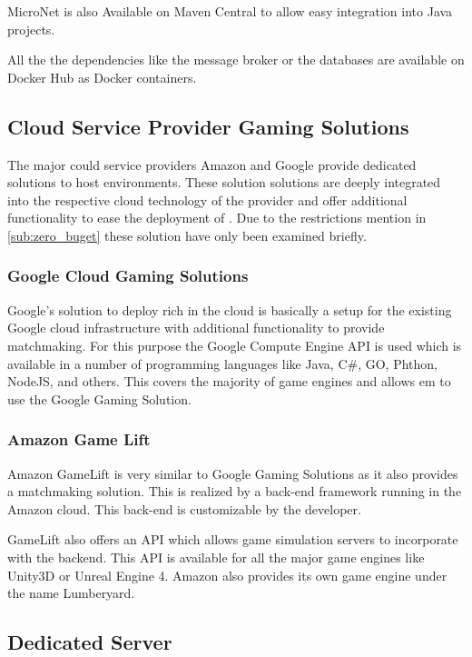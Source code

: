 MicroNet is also Available on Maven Central to allow easy integration into Java
projects.

All the the dependencies like the message broker or the databases are available
on Docker Hub as Docker containers.

\subsection{Cloud Service Provider Gaming Solutions}

The major could service providers Amazon and Google provide dedicated solutions
to host \og{} environments. These solution solutions are deeply integrated
into the respective cloud technology of the provider and offer additional
functionality to ease the deployment of \ogs{}. Due to the restrictions mention
in \autoref{sub:zero_buget} these solution have only been examined briefly.

\subsubsection{Google Cloud Gaming Solutions}

Google's solution to deploy rich \ogs{} in the cloud is basically a setup
for the existing Google cloud infrastructure with additional functionality to
provide matchmaking. For this purpose the Google Compute Engine API is used
which is available in a number of programming languages like Java, C\#, GO,
Phthon, NodeJS, and others. This covers the majority of game engines and
allows em to use the Google Gaming Solution.

\subsubsection{Amazon Game Lift}

Amazon GameLift is very similar to Google Gaming Solutions as it also provides
a matchmaking solution. This is realized by a back-end framework running in the
Amazon cloud. This back-end is customizable by the developer. 

GameLift also offers an API which allows game simulation servers to incorporate
with the backend. This API is available for all the major game engines
like Unity3D or Unreal Engine 4. Amazon also provides its own game engine under
the name Lumberyard.

\subsection{Dedicated Server}


